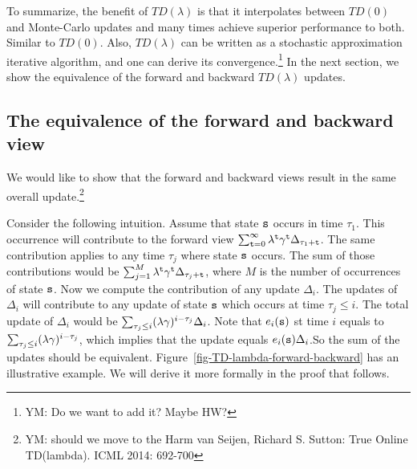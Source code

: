  To summarize, the
benefit of $TD(\lambda)$ is that it interpolates between $TD(0)$ and
Monte-Carlo updates and many times achieve superior performance to
both.
%
Similar to $TD(0)$. Also,  $TD(\lambda)$ can be written as a
stochastic approximation iterative algorithm, and one can derive its convergence.\footnote{YM: Do we want to add it? Maybe HW?}
%
In the next section, we show the equivalence of the forward and
backward $TD(\lambda)$ updates.
%

\subsection{The equivalence of the forward and backward view}

We would like to show that the forward and backward views result in the same overall update.\footnote{YM: should we move to the Harm van Seijen, Richard S. Sutton: True Online TD(lambda). ICML 2014: 692-700}

Consider the following intuition. Assume that state ${\tt s}$ occurs in time $\tau_1$. This occurrence will contribute to the forward view $\sum_{{\tt t}=0}^\infty \lambda^{\tt t}\gamma^{\tt t}\Delta_{\tau_1+{\tt t}} $.
The same contribution applies to any time $\tau_j$ where state ${\tt s}$ occurs. The sum of those contributions would be $\sum_{j=1}^M \lambda^{\tt t}\gamma^{\tt t}\Delta_{\tau_j+{\tt t}} $, where $M$ is the number of occurrences of state ${\tt s}$. Now we compute the contribution of any update $\Delta_i$. The updates of $\Delta_i$ will  contribute to any update of state ${\tt s}$ which occurs at time $\tau_j\leq i$. The total update of $\Delta_i$ would be $\sum_{\tau_j\leq i } (\lambda\gamma)^{i-\tau_j}\Delta_i $. Note that $e_i({\tt s})$ st time $i$ equals to $\sum_{\tau_j\leq i } (\lambda\gamma)^{i-\tau_j}$, which implies that the update equals $e_i({\tt s})\Delta_i$.So the sum of the updates should be equivalent. Figure~\ref{fig-TD-lambda-forward-backward} has an illustrative example.
We will derive it more formally in the proof that follows.

